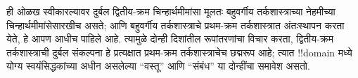 \documentclass[../../../include/open-logic-section]{subfiles}
\begin{document}
ही ओळख स्वीकारल्यावर दुर्बल द्वितीय-क्रम चिन्हार्थमीमांसा मूलतः बहुवर्गीय
तर्कशास्त्राच्या नेहमीच्या चिन्हार्थमीमांसेसारखीच असते; आणि बहुवर्गीय
तर्कशास्त्राचे प्रथम-क्रम तर्कशास्त्रात अंतःस्थापन करता येते, हे आपण आधीच
पाहिले आहे. त्यामुळे दोन्ही दिशांतील रूपांतरणांचा विचार करता, द्वितीय-क्रम
तर्कशास्त्राची दुर्बल संकल्पना हे प्रत्यक्षात प्रथम-क्रम तर्कशास्त्राचेच
छद्मरूप आहे; त्यात !!{domain} मध्ये योग्य स्वयंसिद्धकांच्या अधीन असलेल्या
“वस्तू” आणि “संबंध” या दोन्हींचा समावेश असतो.
\end{document}
